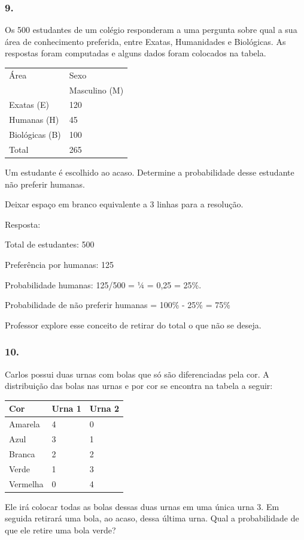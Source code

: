\subsubsection{9.}\label{section-86}

Os 500 estudantes de um colégio responderam a uma pergunta sobre qual a
sua área de conhecimento preferida, entre Exatas, Humanidades e
Biológicas. As respostas foram computadas e alguns dados foram colocados
na tabela.

\begin{longtable}[]{@{}ll@{}}
\toprule
Área & Sexo\tabularnewline
& Masculino (M)\tabularnewline
Exatas (E) & 120\tabularnewline
Humanas (H) & 45\tabularnewline
Biológicas (B) & 100\tabularnewline
Total & 265\tabularnewline
\bottomrule
\end{longtable}

Um estudante é escolhido ao acaso. Determine a probabilidade desse
estudante não preferir humanas.

Deixar espaço em branco equivalente a 3 linhas para a resolução.

Resposta:

Total de estudantes: 500

Preferência por humanas: 125

Probabilidade humanas: 125/500 = ¼ = 0,25 = 25\%.

Probabilidade de não preferir humanas = 100\% - 25\% = 75\%

Professor explore esse conceito de retirar do total o que não se deseja.

\subsubsection{10.}\label{section-87}

Carlos possui duas urnas com bolas que só são diferenciadas pela cor. A
distribuição das bolas nas urnas e por cor se encontra na tabela a
seguir:

\begin{longtable}[]{@{}lll@{}}
\toprule
Cor & Urna 1 & Urna 2\tabularnewline
\midrule
\endhead
Amarela & 4 & 0\tabularnewline
Azul & 3 & 1\tabularnewline
Branca & 2 & 2\tabularnewline
Verde & 1 & 3\tabularnewline
Vermelha & 0 & 4\tabularnewline
\bottomrule
\end{longtable}

Ele irá colocar todas as bolas dessas duas urnas em uma única urna 3. Em
seguida retirará uma bola, ao acaso, dessa última urna. Qual a
probabilidade de que ele retire uma bola verde?

